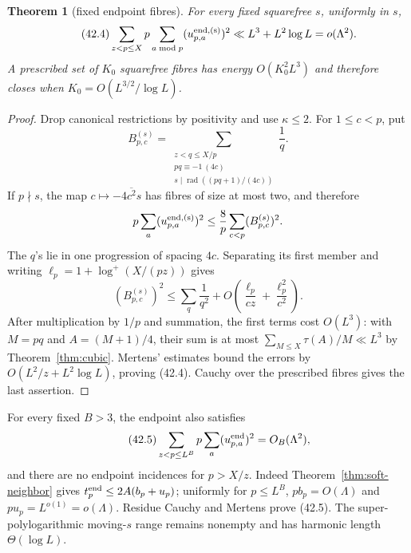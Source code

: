 \documentclass[10pt,reqno]{amsart}
\newtheorem{theorem}{Theorem}[section]
\theoremstyle{definition}
\newcommand{\rad}{\operatorname {rad}}
\newcommand{\1}{\mathbf 1}
\begin{document}
\begin{theorem}[fixed endpoint fibres]\label{thm:fixed-fibre}
For every fixed squarefree $s$, uniformly in $s$,
\begin{equation}\tag{42.4}
 \sum_{z<p\leq X}p\sum_{a\bmod p}
       (u^{\rm end,(s)}_{p,a})^2
 \ll L^3+L^2\log L=o(\Lambda^2).
\end{equation}
A prescribed set of $K_0$ squarefree fibres has energy $O(K_0^2L^3)$ and
therefore closes when $K_0=O(L^{3/2}/\log L)$.
\end{theorem}
\begin{proof}
Drop canonical restrictions by positivity and use $\kappa\leq2$.  For
$1\leq c<p$, put
\[
 B_{p,c}^{(s)}=\sum_{\substack{z<q\leq X/p\\pq\equiv-1\ (4c)\\
                  s\mid\rad((pq+1)/(4c))}}\frac1q.
\]
If $p\nmid s$, the map $c\mapsto-\overline{4c^2s}$ has fibres of size at
most two, and therefore
\[
 p\sum_a(u^{\rm end,(s)}_{p,a})^2
 \leq\frac8p\sum_{c<p}(B_{p,c}^{(s)})^2.
\]
The $q$'s lie in one progression of spacing $4c$.  Separating
its first member and writing $\ell_p=1+\log^+(X/(pz))$ gives
\[
 (B_{p,c}^{(s)})^2\leq
 \sum_{q}\frac1{q^2}
 +O\left(\frac{\ell_p}{cz}+\frac{\ell_p^2}{c^2}\right).
\]
After multiplication by $1/p$ and summation, the first terms cost
$O(L^3)$: with $M=pq$ and $A=(M+1)/4$, their sum is at most
$\sum_{M\leq X}\tau(A)/M\ll L^3$ by Theorem~\ref{thm:cubic}.
Mertens' estimates bound the errors by $O(L^2/z+L^2\log L)$, proving
(42.4).  Cauchy over the prescribed fibres gives the last assertion.
\end{proof}

For every fixed $B>3$, the endpoint also satisfies
\begin{equation}\tag{42.5}
 \sum_{z<p\leq L^B}p\sum_a(u^{\rm end}_{p,a})^2
 =O_B(\Lambda^2),
\end{equation}
and there are no endpoint incidences for $p>X/z$.  Indeed
Theorem~\ref{thm:soft-neighbor} gives
$t_p^{\rm end}\leq2A(b_p+u_p)$; uniformly for $p\leq L^B$,
$pb_p=O(\Lambda)$ and $pu_p=L^{o(1)}=o(\Lambda)$.  Residue Cauchy and
Mertens prove (42.5).  The super-polylogarithmic moving-$s$ range remains
nonempty and has harmonic length $\Theta(\log L)$.
\end{document}
